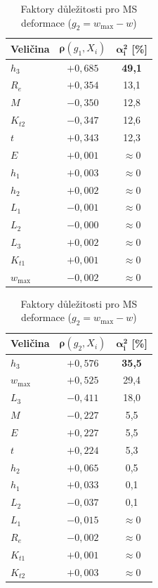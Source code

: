 \begin{table}[H]
\centering
\begin{minipage}[t]{0.48\linewidth}
\centering
\caption{Faktory důležitosti pro MS pružnosti ($g_1 = R_e - \sigma_{\max}$)}
\begin{tabular}{lcc}
\toprule
\textbf{Veličina} & $\boldsymbol{\rho}(g_1, X_i)$ & $\boldsymbol{\alpha_i^2}$ [\%] \\
\midrule
$h_3$      & $+0{,}685$ & \textbf{49{,}1} \\
$R_e$      & $+0{,}354$ & 13{,}1 \\
$M$        & $-0{,}350$ & 12{,}8 \\
$K_{t2}$   & $-0{,}347$ & 12{,}6 \\
$t$        & $+0{,}343$ & 12{,}3 \\
$E$        & $+0{,}001$ & $\approx 0$ \\
$h_1$      & $+0{,}003$ & $\approx 0$ \\
$h_2$      & $+0{,}002$ & $\approx 0$ \\
$L_1$      & $-0{,}001$ & $\approx 0$ \\
$L_2$      & $-0{,}000$ & $\approx 0$ \\
$L_3$      & $+0{,}002$ & $\approx 0$ \\
$K_{t1}$   & $+0{,}001$ & $\approx 0$ \\
$w_{\max}$ & $-0{,}002$ & $\approx 0$ \\
\bottomrule
\end{tabular}
\end{minipage}\hfill
\begin{minipage}[t]{0.48\linewidth}
\centering
\caption{Faktory důležitosti pro MS deformace ($g_2 = w_{\max} - w$)}
\begin{tabular}{lcc}
\toprule
\textbf{Veličina} & $\boldsymbol{\rho}(g_2, X_i)$ & $\boldsymbol{\alpha_i^2}$ [\%] \\
\midrule
$h_3$      & $+0{,}576$ & \textbf{35{,}5} \\
$w_{\max}$ & $+0{,}525$ & 29{,}4 \\
$L_3$      & $-0{,}411$ & 18{,}0 \\
$M$        & $-0{,}227$ & 5{,}5 \\
$E$        & $+0{,}227$ & 5{,}5 \\
$t$        & $+0{,}224$ & 5{,}3 \\
$h_2$      & $+0{,}065$ & 0{,}5 \\
$h_1$      & $+0{,}033$ & 0{,}1 \\
$L_2$      & $-0{,}037$ & 0{,}1 \\
$L_1$      & $-0{,}015$ & $\approx 0$ \\
$R_e$      & $-0{,}002$ & $\approx 0$ \\
$K_{t1}$   & $+0{,}001$ & $\approx 0$ \\
$K_{t2}$   & $+0{,}003$ & $\approx 0$ \\
\bottomrule
\end{tabular}
\end{minipage}
\end{table}

